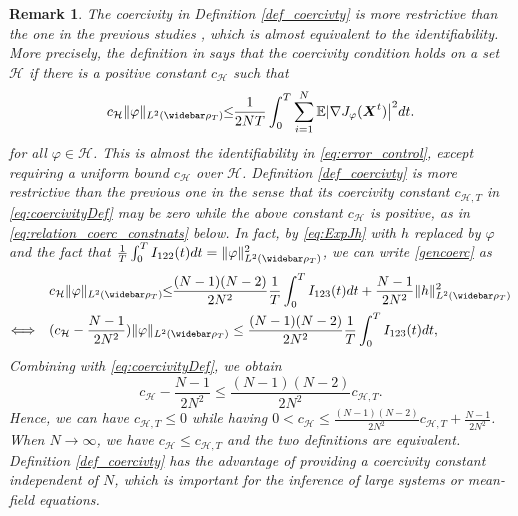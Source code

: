 \documentclass[]{elsarticle}
\def\E{\mathbb{E}}
\newcommand{\wbar}\widebar
\newcommand{\mbf}[1]{\boldsymbol{#1}}
\newcommand{\bX}{\mbf{X}}
\newcommand{\intkernelvar}{\varphi}
\newcommand{\hypspace}{\mathcal{H}}
\newtheorem{remark}[theorem]{Remark}
\numberwithin{equation}{section}
\numberwithin{theorem}{section}
\begin{document}
\begin{remark}\label{rmk:differentCC}
The coercivity in Definition {\rm \ref{def_coercivty}} is more restrictive than the one in the previous studies {\rm \cite{LZTM19,LMT19,LMT20}}, which is almost equivalent to the identifiability. More precisely, the definition in {\rm \cite[Definition 3.1]{LMT20}} says that the coercivity condition holds on a set $\hypspace$ if there is a positive constant $c_\hypspace$ such that
\begin{align}\label{gencoerc}
  c_{\hypspace} \|\intkernelvar\|_{L^2(\wbar\rho_T)}  \!\!\leq   \!\!\frac{1}{2NT}\int_0^T\sum_{i=1}^{N}\E | \nabla J_\varphi(\bX^t)\big|^2 dt. 
 \end{align}
for all $\varphi\in \hypspace$. This is almost the identifiability in \eqref{eq:error_control}, except requiring a uniform bound $c_\hypspace$ over $\hypspace$. Definition {\rm \ref{def_coercivty} } is more restrictive than the previous one in the sense that its coercivity constant $c_{\hypspace,T}$ in \eqref{eq:coercivityDef} may be zero while the above constant $c_\hypspace$ is positive, as in \eqref{eq:relation_coerc_constnats} below. 
 In fact, by \eqref{eq:ExpJh} with $h$ replaced by $\varphi$ and the fact that $\frac{1}{T}\int_0^T I_{122}(t) dt = \|\varphi\|_{L^2(\wbar \rho_T)}^2$, we can write \eqref{gencoerc} as
\begin{align*}
& c_{\hypspace} \|\intkernelvar\|_{L^2(\wbar\rho_T)}  \!\!\leq   \!\! \frac{(N-1)(N-2)}{2N^2} \frac{1}{T}\int_{0}^T   I_{123}(t)dt + \frac{N-1}{2N^2} \|h\|_{L^2(\wbar \rho_T)}^2 \\
\Longleftrightarrow \quad & ( c_{\hypspace}- \frac{N-1}{2N^2}) \|\intkernelvar\|_{L^2(\wbar\rho_T)} \leq   \frac{(N-1)(N-2)}{2N^2} \frac{1}{T}\int_{0}^T   I_{123}(t)dt, 
\end{align*}
Combining with \eqref{eq:coercivityDef}, we obtain
\begin{equation}\label{eq:relation_coerc_constnats}
 c_{\hypspace}- \frac{N-1}{2N^2} \leq \frac{(N-1)(N-2)}{2N^2} c_{\hypspace, T}.
 \end{equation}
Hence, we can have $c_{\hypspace,T} \leq 0$ while having $0 < c_\hypspace \leq  \frac{(N-1)(N-2)}{2N^2} c_{\hypspace,T} + \frac{N-1}{2N^2} $.  When $N\to \infty$, we have $c_\hypspace \leq c_{\hypspace,T}$ and the two definitions are equivalent. Definition {\rm \ref{def_coercivty}} has the advantage of providing a coercivity constant independent of $N$, which is important for the inference of large systems or mean-field equations.  
\end{remark}
\end{document}
